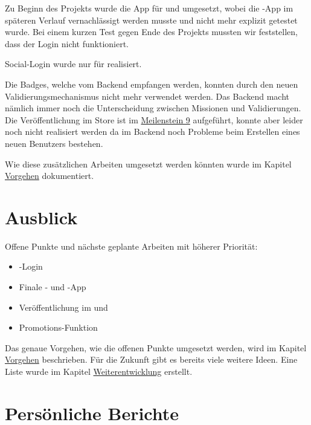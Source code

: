 Zu Beginn des Projekts wurde die App für  und  umgesetzt, wobei die -App im späteren Verlauf vernachlässigt werden musste und nicht mehr explizit getestet wurde.
Bei einem kurzen Test gegen Ende des Projekts mussten wir feststellen, dass der  Login nicht funktioniert.

Social-Login wurde nur für  realisiert.

Die Badges, welche vom \gls{Backend} empfangen werden, konnten durch den neuen Validierungsmechanismus nicht mehr verwendet werden.
Das Backend macht nämlich immer noch die Unterscheidung zwischen Missionen und Validierungen.
Die Veröffentlichung im  Store ist im \hyperref[pm-ms9]{Meilenstein 9} aufgeführt, konnte aber leider noch nicht realisiert werden da im Backend noch Probleme beim Erstellen eines neuen Benutzers bestehen.

Wie diese zusätzlichen Arbeiten umgesetzt werden könnten wurde im Kapitel \hyperref[pd-weiterentwicklung-vorgehen]{Vorgehen} dokumentiert.

\section{Ausblick}
Offene Punkte und nächste geplante Arbeiten mit höherer Priorität:

\begin{itemize}
	\item {}-Login
	\item Finale - und -App
	\item Veröffentlichung im  und  
	\item Promotions-Funktion
\end{itemize}

Das genaue Vorgehen, wie die offenen Punkte umgesetzt werden, wird im Kapitel \hyperref[pd-weiterentwicklung-vorgehen]{Vorgehen} beschrieben.
Für die Zukunft gibt es bereits viele weitere Ideen. 
Eine Liste wurde im Kapitel \hyperref[pd-weiterentwicklung-realistisch]{Weiterentwicklung} erstellt. 


\newpage
\section{Persönliche Berichte}
